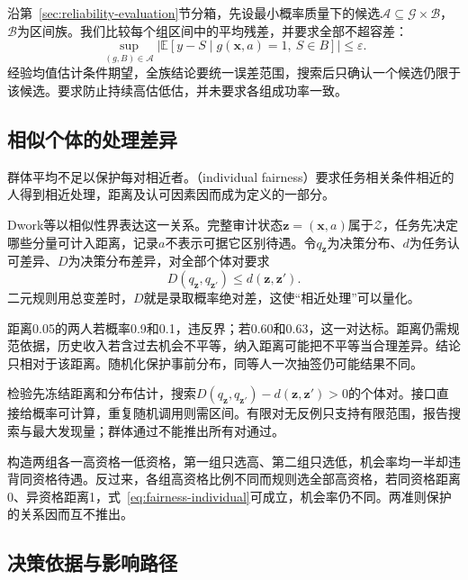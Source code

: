 沿第~\ref{sec:reliability-evaluation}节分箱，先设最小概率质量下的候选$\mathcal A\subseteq\mathcal G\times\mathcal B$，$\mathcal B$为区间族。我们比较每个组区间中的平均残差，并要求全部不超容差：
\begin{equation}
 \sup_{(g,B)\in\mathcal A}
 \left|\mathbb E[y-S\mid
       g(\bm{x},a)=1,\ S\in B]\right|
 \leq\varepsilon.
 \label{eq:fairness-multicalibration}
\end{equation}
经验均值估计条件期望，全族结论要统一误差范围，搜索后只确认一个候选仍限于该候选。要求防止持续高估低估，并未要求各组成功率一致。

\subsection{相似个体的处理差异}
\label{sec:fairness-individual-comparison}

群体平均不足以保护每对相近者。（individual fairness）要求任务相关条件相近的人得到相近处理，距离及认可因素因而成为定义的一部分。

Dwork等以相似性界表达这一关系。完整审计状态$\bm z=(\bm x,a)$属于$\mathcal Z$，任务先决定哪些分量可计入距离，记录$a$不表示可据它区别待遇。令$q_{\bm z}$为决策分布、$d$为任务认可差异、$D$为决策分布差异，对全部个体对要求
\begin{equation}
 D(q_{\bm z},q_{\bm z'})\leq d(\bm z,\bm z').
 \label{eq:fairness-individual}
\end{equation}
二元规则用总变差时，$D$就是录取概率绝对差，这使“相近处理”可以量化。

距离0.05的两人若概率0.9和0.1，违反界；若0.60和0.63，这一对达标。距离仍需规范依据，历史收入若含过去机会不平等，纳入距离可能把不平等当合理差异。结论只相对于该距离。随机化保护事前分布，同等人一次抽签仍可能结果不同。

检验先冻结距离和分布估计，搜索$D(q_{\bm z},q_{\bm z'})-d(\bm z,\bm z')>0$的个体对。接口直接给概率可计算，重复随机调用则需区间。有限对无反例只支持有限范围，报告搜索与最大发现量；群体通过不能推出所有对通过。

构造两组各一高资格一低资格，第一组只选高、第二组只选低，机会率均一半却违背同资格待遇。反过来，各组高资格比例不同而规则选全部高资格，若同资格距离0、异资格距离1，式~\eqref{eq:fairness-individual}可成立，机会率仍不同。两准则保护的关系因而互不推出。

\subsection{决策依据与影响路径}
\label{sec:fairness-counterfactual-comparison}

